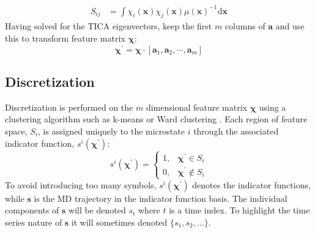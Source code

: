 \begin{align}
    S_{ij} &= \int \chi_{i}(\mathbf{x})\chi_{j}(\mathbf{x})\mu(\mathbf{x})^{-1} \mathrm{d}\mathbf{x}
\end{align}
Having solved for the TICA eigenvectors, keep the first $m$ columns of $\mathbf{a}$ and use this to transform feature matrix $\bm{\chi}$: \cite{perez-hernandezIdentificationSlowMolecular2013a}\cite{schwantesImprovementsMarkovState2013}
\begin{equation}
    \bm{\chi}^{\prime} = \bm{\chi}\cdot[\mathbf{a}_{1}, \mathbf{a}_{2}, \cdots,  \mathbf{a}_{m}]
\end{equation}

\subsection{Discretization}
Discretization is performed on the $m$ dimensional feature matrix $\bm{\chi}$ using a clustering algorithm such as k-means or Ward clustering \cite{husicWardClusteringImproves2017a}. Each region of feature space, $S_{i}$, is assigned uniquely to the microstate $i$ through the associated indicator function, $s^{i}(\bm{\chi}^{\prime})$: \cite{prinzMarkovModelsMolecular2011}
\begin{equation}
s^{i}(\bm{\chi}^{\prime})=\left\{\begin{array}{ll}
1, & \bm{\chi}^{\prime} \in S_{i} \\
0, & \bm{\chi}^{\prime} \notin S_{i}
\end{array}\right.
\end{equation}
To avoid introducing too many symbols, $s^{i}(\bm{\chi}^{\prime})$ denotes the indicator functions, while $\mathbf{s}$ is the MD trajectory in the indicator function basis. The individual components of $\mathbf{s}$ will be denoted $s_{t}$ where $t$ is a time index. To highlight the time series nature of $\mathbf{s}$ it will sometimes denoted $\{s_{1}, s_{2}, \ldots \}$. 

